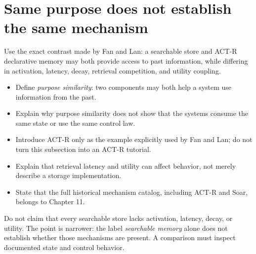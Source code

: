 \section{Same purpose does not establish the same mechanism}
Use the exact contrast made by Fan and Lan: a searchable store and ACT-R declarative memory may both provide access to past information, while differing in activation, latency, decay, retrieval competition, and utility coupling.
\begin{itemize}
  \item Define \emph{purpose similarity}: two components may both help a system use information from the past.
  \item Explain why purpose similarity does not show that the systems consume the same state or use the same control law.
  \item Introduce ACT-R only as the example explicitly used by Fan and Lan; do not turn this subsection into an ACT-R tutorial.
  \item Explain that retrieval latency and utility can affect behavior, not merely describe a storage implementation.
  \item State that the full historical mechanism catalog, including ACT-R and Soar, belongs to Chapter 11.
\end{itemize}
\begin{notebox}
Do not claim that every searchable store lacks activation, latency, decay, or utility. The point is narrower: the label \emph{searchable memory} alone does not establish whether those mechanisms are present. A comparison must inspect documented state and control behavior.
\end{notebox}

